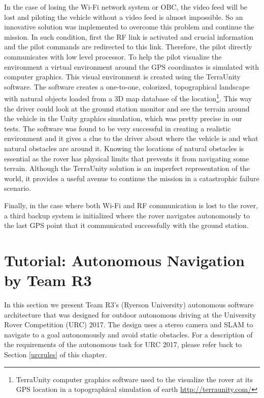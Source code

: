 \documentclass[runningheads,a4paper]{llncs}
\begin{document}
In the case of losing the Wi-Fi network system or OBC, the video feed will be lost and piloting the vehicle without a video feed is almost impossible. So an innovative solution was implemented to overcome this problem and continue the mission. In such condition, first the RF link is activated and crucial information and the pilot commands are redirected to this link. Therefore, the pilot directly communicates with low level processor. To help the pilot visualize the environment a virtual environment around the GPS coordinates is simulated with computer graphics. This visual environment is created using the TerraUnity software. The software creates a one-to-one, colorized, topographical landscape with natural objects loaded from a 3D map database of the location\footnote{TerraUnity computer graphics software used to the visualize the rover at its GPS location in a topographical simulation of earth \url{http://terraunity.com/}}. This way the driver could look at the ground station monitor and see the terrain around the vehicle in the Unity graphics simulation, which was pretty precise in our tests. The software was found to be very successful in creating a realistic environment and it gives a clue to the driver about where the vehicle is and what natural obstacles are around it. Knowing the locations of natural obstacles is essential as the rover has physical limits that prevents it from navigating some terrain. Although the TerraUnity solution is an imperfect representation of the world, it provides a useful avenue to continue the mission in a catastrophic failure scenario.

Finally, in the case where both Wi-Fi and RF communication is lost to the rover, a third backup system is initialized where the rover navigates autonomously to the last GPS point that it communicated successfully with the ground station.

\section{Tutorial: Autonomous Navigation by Team R3}\label{r3auto}

In this section we present Team R3's (Ryerson University) autonomous software architecture that was designed for outdoor autonomous driving at the University Rover Competition (URC) 2017. The design uses a stereo camera and SLAM to navigate to a goal autonomously and avoid static obstacles. For a description of the requirements of the autonomous task for URC 2017, please refer back to Section \ref{urcrules} of this chapter.
\end{document}
